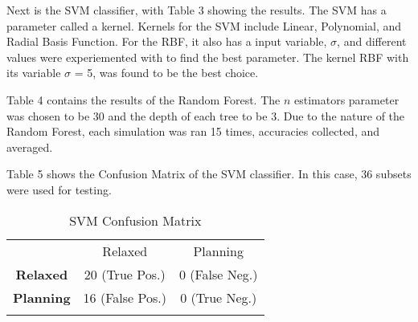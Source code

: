 \documentclass[conference,compsoc]{IEEEtran}
\begin{document}
Next is the SVM classifier, with Table 3 showing the results. The SVM has a parameter called a kernel. Kernels for the SVM include Linear, Polynomial, and Radial Basis Function. 
For the RBF, it also has a input variable,  $\sigma$, and different values were experiemented with to find the best parameter. The kernel RBF with its 
variable $\sigma$ = 5, was found to be the best choice.
\begin{table*}[h]
	\noindent{}
	\caption{Accuracies for SVM Classifier}
	\label{table3}
\end{table*}

Table 4 contains the results of the Random Forest. The $n$ estimators parameter was chosen to be $30$ and the depth of each tree to be $3$. 
Due to the nature of the Random Forest, each simulation was ran 15 times, accuracies collected, and averaged.
\begin{table*}[h]
	\noindent{}
	\caption{Accuracies for Random Forest Classifier}
	\label{table4}
\end{table*}

Table 5 shows the Confusion Matrix of the SVM classifier. In this case, 36 subsets were used for testing.
\begin{table}
\begin{tabularx}{.7\textwidth}{>{\bfseries} c | c c | }
& Relaxed & \multicolumn{1}{c}{Planning}\\
\hhline{---}
Relaxed & 20 (True Pos.) \cellcolor[gray]{.8}& 0 (False Neg.) \\ 
Planning & 16 (False Pos.) & 0 (True Neg.) \cellcolor[gray]{.8} \\
\hhline{~--}
\end{tabularx}
\caption{SVM Confusion Matrix}
\label{table5}
\end{table}
\end{document}
